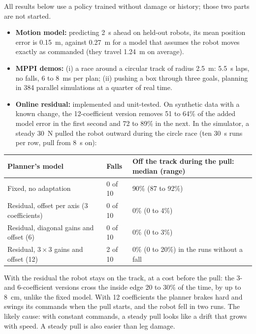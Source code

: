 \documentclass[10pt]{article}
\begin{document}
All results below use a policy trained without damage or history; those two
parts are not started.
\begin{itemize}
  \item \textbf{Motion model:} predicting 2~s ahead on held-out robots, its
    mean position error is 0.15~m, against 0.27~m for a model that assumes the
    robot moves exactly as commanded (they travel 1.24~m on average).
  \item \textbf{MPPI demos:} (i) a race around a circular track of radius
    2.5~m: 5.5~s laps, no falls, 6 to 8~ms per plan; (ii) pushing a box
    through three goals, planning in 384 parallel simulations at a quarter of
    real time.
  \item \textbf{Online residual:} implemented and unit-tested. On synthetic
    data with a known change, the 12-coefficient version removes 51 to 64\% of
    the added model error in the first second and 72 to 89\% in the next. In
    the simulator, a steady 30~N pulled the robot outward during the circle
    race (ten 30~s runs per row, pull from 8~s on):
\end{itemize}
\begin{center}
  \small
  \begin{tabular}{@{}lll@{}}
    \toprule
    Planner's model & Falls & Off the track during the pull: median (range) \\
    \midrule
    Fixed, no adaptation & 0 of 10 & 90\% (87 to 92\%) \\
    Residual, offset per axis (3 coefficients) & 0 of 10 & 0\% (0 to 4\%) \\
    Residual, diagonal gains and offset (6) & 0 of 10 & 0\% (0 to 3\%) \\
    Residual, $3 \times 3$ gains and offset (12) & 2 of 10 & 0\% (0 to 20\%) in
    the runs without a fall \\
    \bottomrule
  \end{tabular}
\end{center}
With the residual the robot stays on the track, at a cost before the pull: the
3- and 6-coefficient versions cross the inside edge 20 to 30\% of the time, by
up to 8~cm, unlike the fixed model. With 12 coefficients the planner brakes
hard and swings its commands when the pull starts, and the robot fell
in two runs. The likely cause: with constant commands, a steady pull looks
like a drift that grows with speed. A steady pull is also easier than leg
damage.

{\footnotesize
\let\oldthebibliography\thebibliography
\renewcommand{\thebibliography}[1]{\oldthebibliography{#1}%
  \setlength{\itemsep}{0pt}\setlength{\parskip}{0pt}}


}
\end{document}
